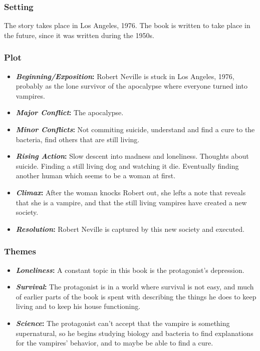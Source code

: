 \subsubsection{Setting}

The story takes place in Los Angeles, 1976. The book is written to take place in the future, since it was written during the 1950s.

\subsubsection{Plot}

\begin{itemize}
	\item \textbf{\textit{Beginning/Exposition}:} Robert Neville is stuck in Los Angeles, 1976, probably as the lone survivor of the apocalypse where everyone turned into vampires.
	\item \textbf{\textit{Major Conflict}:} The apocalypse.
	\item \textbf{\textit{Minor Conflicts}:} Not commiting suicide, understand and find a cure to the bacteria, find others that are still living.
	\item \textbf{\textit{Rising Action}:} Slow descent into madness and loneliness. Thoughts about suicide. Finding a still living dog and watching it die. Eventually finding another human which seems to be a woman at first.
	\item \textbf{\textit{Climax}:} After the woman knocks Robert out, she lefts a note that reveals that she is a vampire, and that the still living vampires have created a new society. 
	\item \textbf{\textit{Resolution}:} Robert Neville is captured by this new society and executed.
\end{itemize}

\subsubsection{Themes}

\begin{itemize}
	\item \textbf{\textit{Loneliness}:} A constant topic in this book is the protagonist's depression. 
	\item \textbf{\textit{Survival}:} The protagonist is in a world where survival is not easy, and much of earlier parts of the book is spent with describing the things he does to keep living and to keep his house functioning.
	\item \textbf{\textit{Science}:} The protagonist can't accept that the vampire is something supernatural, so he begins  studying biology and bacteria to find explanations for the vampires' behavior, and to maybe be able to find a cure.
\end{itemize}

